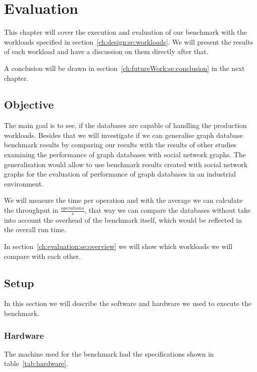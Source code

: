 \chapter{Evaluation}
\label{ch:evaluation}
This chapter will cover the execution and evaluation of our benchmark with the workloads specified in section~\ref{ch:design:se:workloads}.
We will present the results of each workload and have a discussion on them directly after that.

A conclusion will be drawn in section~\ref{ch:futureWork:se:conclusion} in the next chapter.

\section{Objective}
The main goal is to see,
if the databases are capable of handling the production workloads.
Besides that we will investigate if we can generalise graph database benchmark results by comparing our results with the results of other studies examining the performance of graph databases with social network graphs.
The generalisation would allow to use benchmark results created with social network graphs for the evaluation of performance of graph databases in an industrial environment.

We will measure the time per operation and with the average we can calculate the throughput in $ \frac{operations}{s} $,
that way we can compare the databases without take into account the overhead of the benchmark itself,
which would be reflected in the overall run time.

In section~\ref{ch:evaluation:se:overview} we will show which workloads we will compare with each other.

\section{Setup}
In this section we will describe the software and hardware we used to execute the benchmark.

\subsection{Hardware}
The machine used for the benchmark had the specifications shown in table~\ref{tab:hardware}.

